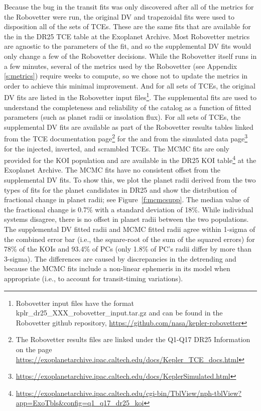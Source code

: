 Because the bug in the transit fits was only discovered after all of the metrics for the Robovetter were run, the original DV and trapezoidal fits were used to disposition all of the sets of TCEs. These are the same fits that are available for the  in the DR25 TCE table at the Exoplanet Archive. Most Robovetter metrics are agnostic to the parameters of the fit, and so the supplemental DV fits would only change a few of the Robovetter decisions. While the Robovetter itself runs in a few minutes, several of the metrics used by the Robovetter (see Appendix \ref{s:metrics}) require weeks to compute, so we chose not to update the metrics in order to achieve this minimal improvement. And for all sets of TCEs, the original DV fits are listed in the Robovetter input files\footnote{Robovetter input files have the format kplr\_dr25\_XXX\_robovetter\_input.tar.gz and can be found in the Robovetter github repository, \url{https://github.com/nasa/kepler-robovetter}}. The supplemental fits are used to understand the completeness and reliability of the catalog as a function of fitted parameters (such as planet radii or insolation flux). For all sets of TCEs, the supplemental DV fits are available as part of the Robovetter results tables linked from the TCE documentation page\footnote{The Robovetter results files are linked under the Q1-Q17 DR25 Information on the page \url{https://exoplanetarchive.ipac.caltech.edu/docs/Kepler\_TCE\_docs.html}} for the  and from the simulated data page\footnote{\url{https://exoplanetarchive.ipac.caltech.edu/docs/KeplerSimulated.html}} \citep[see][]{Christiansen2017,Coughlin2017a} for the injected, inverted, and scrambled TCEs. The MCMC fits are only provided for the KOI population and are available in the DR25 KOI table\footnote{\url{https://exoplanetarchive.ipac.caltech.edu/cgi-bin/TblView/nph-tblView?app=ExoTbls\&config=q1\_q17\_dr25\_koi}} at the Exoplanet Archive. The MCMC fits have no consistent offset from the supplemental DV fits.  To show this, we plot the planet radii derived from the two types of fits for the planet candidates in DR25 and show the distribution of fractional change in planet radii; see Figure~\ref{f:mcmcsupp}. The median value of the fractional change is 0.7\% with a standard deviation of 18\%. While individual systems disagree, there is no offset in planet radii between the two populations. The supplemental DV fitted radii and MCMC fitted radii agree within 1-sigma of the combined error bar (i.e., the square-root of the sum of the squared errors) for 78\% of the KOIs and 93.4\% of PCs (only 1.8\% of PC's radii differ by more than 3-sigma).  The differences are caused by discrepancies in the detrending and because the MCMC fits include a non-linear ephemeris in its model when appropriate (i.e., to account for transit-timing variations).

